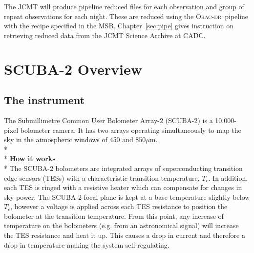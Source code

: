 \documentclass[twoside,11pt]{article}
\newcommand{\htmladdnormallink}[2]{#1}
\newcommand{\htmlref}[2]{#1}
\newcommand{\latexhtml}[2]{#1}
\newcommand{\xlabel}[1]{}
\renewcommand{\_}{\texttt{\symbol{95}}}
\newcommand{\oracdr}{\htmladdnormallink{\textsc{Orac-dr}}{http://www.oracdr.org/oracdr}}
\newcommand{\cref}[3]{\latexhtml{#1~\ref{#2}}{\htmlref{#3}{#2}}}
\begin{document}
The JCMT will produce pipeline reduced files for each observation and
group of repeat observations for each night. These are reduced using
the \oracdr\ pipeline with the recipe specified in the MSB.
\cref{Chapter}{sec:pipe}{The SCUBA-2 Pipeline} gives instruction on
retrieving reduced data from the
\htmladdnormallink{JCMT Science Archive}{http://www3.cadc-ccda.hia-iha.nrc-cnrc.gc.ca/jcmt/}
at CADC.


\clearpage
\section{\xlabel{scuba2_overview}SCUBA-2 Overview}
\label{sec:s2}
\subsection{\xlabel{scuba2}The instrument}


The Submillimetre Common User Bolometer Array-2 (SCUBA-2) is a
10,000-pixel bolometer camera. It has two arrays operating simultaneously to map
the sky in the atmospheric windows of 450 and 850$\mu$m.
\\*\\*
\textbf{How it works}\\*
The SCUBA-2 bolometers are integrated arrays of superconducting
transition edge sensors (TESs) with a characteristic transition
temperature, $T_c$. In addition, each TES is ringed with a resistive
heater which can compensate for changes in sky power. The SCUBA-2
focal plane is kept at a base temperature slightly below $T_c$,
however a voltage is applied across each TES resistance to position
the bolometer at the transition temperature. From this point, any
increase of temperature on the bolometers (e.g. from an astronomical
signal) will increase the TES resistance and heat it up. This causes a
drop in current and therefore a drop in temperature making the system
self-regulating.
\end{document}
